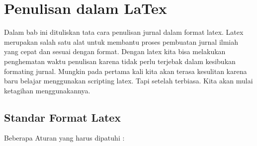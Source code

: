 \chapter{Penulisan dalam LaTex}

Dalam bab ini dituliskan tata cara penulisan jurnal dalam format latex. Latex merupakan salah satu alat untuk membantu proses pembuatan jurnal ilmiah yang cepat dan sesuai dengan format. Dengan latex kita bisa melakukan penghematan waktu penulisan karena tidak perlu terjebak dalam kesibukan formating jurnal. Mungkin pada pertama kali kita akan terasa kesulitan karena baru belajar menggunakan scripting latex. Tapi setelah terbiasa. Kita akan mulai ketagihan menggunakannya.


\section{Standar Format Latex}
Beberapa Aturan yang harus dipatuhi :
